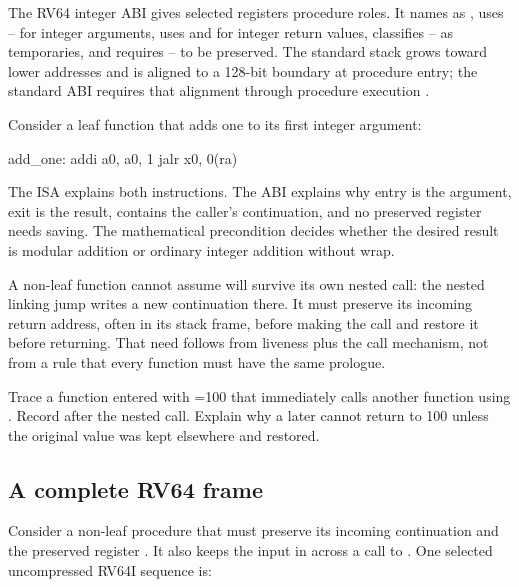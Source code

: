 The RV64 integer ABI gives selected registers procedure roles. It names
 as , uses -- for integer arguments,
uses  and  for integer return values, classifies
-- as temporaries, and requires -- to
be preserved. The standard stack grows toward lower addresses and is aligned
to a 128-bit boundary at procedure entry; the standard ABI requires that
alignment through procedure execution \autocite{riscv2026abi}.

Consider a leaf function that adds one to its first integer argument:

\begin{codelisting}[language={},caption={An RV64I leaf under the selected integer ABI}]
add_one:
    addi a0, a0, 1
    jalr x0, 0(ra)
\end{codelisting}

The ISA explains both instructions. The ABI explains why entry  is
the argument, exit  is the result,  contains the caller's
continuation, and no preserved register needs saving. The mathematical
precondition decides whether the desired result is modular addition or
ordinary integer addition without wrap.

A non-leaf function cannot assume  will survive its own nested call:
the nested linking jump writes a new continuation there. It must preserve its
incoming return address, often in its stack frame, before making the call and
restore it before returning. That need follows from liveness plus the call
mechanism, not from a rule that every function must have the same prologue.

\begin{tryit}[title={Find the first overwritten continuation}]
Trace a function entered with =100 that immediately calls another
function using . Record  after the nested call.
Explain why a later  cannot return to 100 unless the
original value was kept elsewhere and restored.
\end{tryit}

\subsection{A complete RV64 frame}

Consider a non-leaf procedure that must preserve its incoming continuation and
the preserved register . It also keeps the input in  across
a call to . One selected uncompressed RV64I sequence is:

